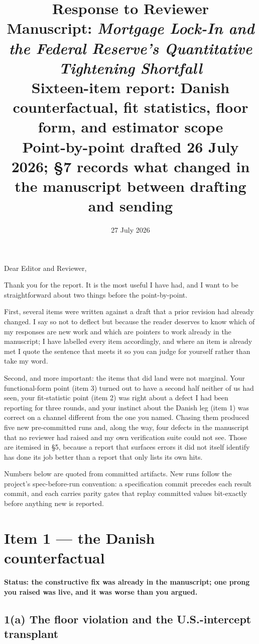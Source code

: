 \documentclass[11pt]{article}
\title{\vspace{-2em}Response to Reviewer\\[0.3em]
\large Manuscript: \emph{Mortgage Lock-In and the Federal Reserve's
Quantitative Tightening Shortfall}\\[0.2em]
\normalsize Sixteen-item report: Danish counterfactual, fit statistics,
floor form, and estimator scope\\[0.2em]
\footnotesize Point-by-point drafted 26 July 2026; \S7 records what changed in the
manuscript between drafting and sending}
\author{}
\date{27 July 2026}
\begin{document}
\sloppy
\maketitle
\vspace{-2.5em}

Dear Editor and Reviewer,

Thank you for the report. It is the most useful I have had, and I want to be
straightforward about two things before the point-by-point.

First, several items were written against a draft that a prior revision had
already changed. I say so not to deflect but because the reader deserves to know
which of my responses are new work and which are pointers to work already in the
manuscript; I have labelled every item accordingly, and where an item is already
met I quote the sentence that meets it so you can judge for yourself rather than
take my word.

Second, and more important: the items that did land were not marginal. Your
functional-form point (item 3) turned out to have a second half neither of us
had seen, your fit-statistic point (item 2) was right about a defect I had been
reporting for three rounds, and your instinct about the Danish leg (item 1) was
correct on a channel different from the one you named. Chasing them produced
five new pre-committed runs and, along the way, four defects in the manuscript
that no reviewer had raised and my own verification suite could not see. Those
are itemised in \S5, because a report that surfaces errors it did not itself
identify has done its job better than a report that only lists its own hits.

Numbers below are quoted from committed artifacts. New runs follow the project's
spec-before-run convention: a specification commit precedes each result commit,
and each carries parity gates that replay committed values bit-exactly before
anything new is reported.

\section{Item 1 --- the Danish counterfactual}

\textbf{Status: the constructive fix was already in the manuscript; one prong
you raised was live, and it was worse than you argued.}

\subsection{1(a) The floor violation and the U.S.-intercept transplant}
\end{document}
